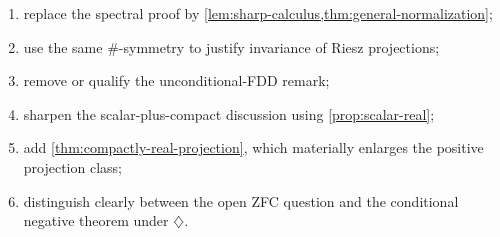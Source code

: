 \documentclass[11pt]{article}
\theoremstyle{definition}
\theoremstyle{remark}
\begin{document}
\begin{enumerate}[label=\arabic*.,leftmargin=2em]
\item replace the spectral proof by \cref{lem:sharp-calculus,thm:general-normalization};
\item use the same $\#$-symmetry to justify invariance of Riesz projections;
\item remove or qualify the unconditional-FDD remark;
\item sharpen the scalar-plus-compact discussion using \cref{prop:scalar-real};
\item add \cref{thm:compactly-real-projection}, which materially enlarges the positive projection class;
\item distinguish clearly between the open ZFC question and the conditional negative theorem under $\diamondsuit$.
\end{enumerate}
\end{document}

